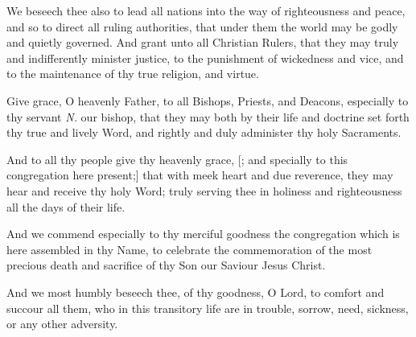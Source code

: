 We beseech thee also to lead all nations into the way of righteousness and peace, and so to direct all 
ruling authorities,
that under them the world may be godly and quietly governed. 
And grant unto %
all Christian Rulers, %
that they may truly and indifferently minister justice, to the punishment of wickedness and vice, and to the maintenance of thy true religion, and virtue.

Give grace, O heavenly Father, to all Bishops, Priests, and Deacons, 
especially to thy servant \emph{N.} our bishop, %
that they may both by their life and doctrine set forth thy true and lively Word, and rightly and duly administer thy holy Sacraments.

And to all thy people give thy heavenly grace,
[; and specially to this congregation here present;] %
that with meek heart and due reverence, they may hear and receive thy holy Word; truly serving thee in holiness and righteousness all the days of their life.

And we commend especially to thy merciful goodness the congregation which is here assembled in thy Name, to celebrate the commemoration of the most precious death and sacrifice of thy Son our Saviour Jesus Christ. 

And we most humbly beseech thee, of thy goodness, O Lord, to comfort and succour all them, who in this transitory life are in trouble, sorrow, need, sickness, or any other adversity.




